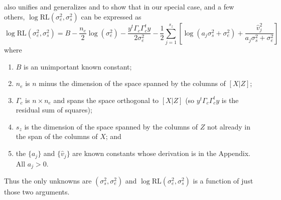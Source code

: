 \documentclass{report}
\newcommand{\RLorig}{\text{RL}}
\newcommand{\logRLorig}{\log\RLorig}
\newcommand{\sigssq}{\sigma_s^2}
\newcommand{\sigesq}{\sigma_e^2}
\newcommand{\logRLssorig}{\logRLorig(\sigesq,\sigssq)}
\newcommand{\ass}{a_j\sigssq + \sigesq}
\begin{document}
\cite{hodges:2013} also unifies and generalizes \cite{reich_hodges:2008} and \cite{welham_thompson:2009} to show that in our special case, and a few others, $\logRLssorig$ can be expressed as
\begin{equation}
\label{eq:reexpress}
  \logRLssorig = B - \frac{n_e}{2}\log(\sigesq) - \frac{y^t \Gamma_c \Gamma^t_c y}{2\sigesq} 
    - \frac{1}{2} \sum_{j=1}^{s_z} \left[ \log(\ass) + \frac{\hat v_j^2}{\ass}\right]
\end{equation}
where
\begin{enumerate}[label=(\arabic*)]
  \item $B$ is an unimportant known constant;
  \item $n_e$ is $n$ minus the dimension of the space spanned by the columns of $[X|Z]$;
  \item $\Gamma_c$ is $n \times n_e$ and spans the space orthogonal to $[X|Z]$
    (so $y^t \Gamma_c \Gamma^t_c y$ is the residual sum of squares);
  \item $s_z$ is the dimension of the space spanned by the columns of $Z$ not already
    in the span of the columns of $X$; and
  \item the $\{a_j\}$ and $\{\hat v_j\}$ are known constants whose derivation is in the Appendix.  All $a_j>0$.
\end{enumerate}
Thus the only unknowns are $(\sigma^2_s, \sigma^2_e)$ and $\logRLssorig$ is a function of just those two arguments.
\end{document}
